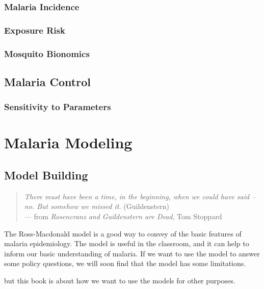 \documentclass[
]{book}
\begin{document}
\section{Malaria Incidence}\label{malaria-incidence}

\section{Exposure Risk}\label{exposure-risk}

\section{Mosquito Bionomics}\label{mosquito-bionomics}

\chapter{Malaria Control}\label{malaria-control}

\section{Sensitivity to Parameters}\label{sensitivity-to-parameters-1}

\part{Malaria Modeling}\label{part-malaria-modeling}

\chapter{Model Building}\label{model-building}

\begin{quote}
\emph{There must have been a time, in the beginning, when we could have said -- no. But somehow we missed it.} (Guildenstern)\\
--- from \emph{Rosencranz and Guildenstern are Dead}, Tom Stoppard
\end{quote}

The Ross-Macdonald model is a good way to convey of the basic features of malaria epidemiology. The model is useful in the classroom, and it can help to inform our basic understanding of malaria. If we want to use the model to answer some policy questions, we will soon find that the model has some limitations.

but this book is about how we want to use the models for other purposes.
\end{document}
